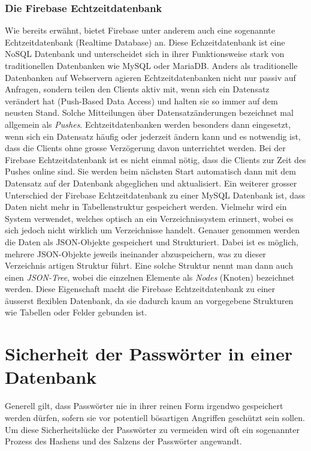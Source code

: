\documentclass[../main.tex]{subfiles}
\begin{document}
	\subsubsection{Die Firebase Echtzeitdatenbank} \label{firebaseRealtime}
	Wie bereits erwähnt, bietet Firebase unter anderem auch eine sogenannte Echtzeitdatenbank (Realtime Database) an. Diese Echzeitdatenbank ist eine NoSQL Datenbank und unterscheidet sich in ihrer Funktionsweise stark von traditionellen Datenbanken wie MySQL oder MariaDB. Anders als traditionelle Datenbanken auf Webservern agieren Echtzeitdatenbanken nicht nur passiv auf Anfragen, sondern teilen den Clients aktiv mit, wenn sich ein Datensatz verändert hat (Push-Based Data Access) und halten sie so immer auf dem neusten Stand. Solche Mitteilungen über Datensatzänderungen bezeichnet mal allgemein als \emph{Pushes}. Echtzeitdatenbanken werden besonders dann eingesetzt, wenn sich ein Datensatz häufig oder jederzeit ändern kann und es notwendig ist, dass die Clients ohne grosse Verzögerung davon unterrichtet werden.\cite{RealtimeDatabase} Bei der Firebase Echtzeitdatenbank ist es nicht einmal nötig, dass die Clients zur Zeit des Pushes online sind. Sie werden beim nächsten Start automatisch dann mit dem Datensatz auf der Datenbank abgeglichen und aktualisiert. Ein weiterer grosser Unterschied der Firebase Echtzeitdatenbank zu einer MySQL Datenbank ist, dass Daten nicht mehr in Tabellenstruktur gespeichert werden. Vielmehr wird ein System verwendet, welches optisch an ein Verzeichnissystem erinnert, wobei es sich jedoch nicht wirklich um Verzeichnisse handelt. Genauer genommen werden die Daten als JSON-Objekte gespeichert und Strukturiert. Dabei ist es möglich, mehrere JSON-Objekte jeweils ineinander abzuspeichern, was zu dieser Verzeichnis artigen Struktur führt. Eine solche Struktur nennt man dann auch einen \emph{JSON-Tree}, wobei die einzelnen Elemente als \emph{Nodes} (Knoten) bezeichnet werden. Diese Eigenschaft macht die Firebase Echtzeitdatenbank zu einer äusserst flexiblen Datenbank, da sie dadurch kaum an vorgegebene Strukturen wie Tabellen oder Felder gebunden ist. \cite{firebaseStructure}\cite{FirebaseRTDB}
	
	
	\section{Sicherheit der Passwörter in einer Datenbank}
	Generell gilt, dass Passwörter nie in ihrer reinen Form irgendwo gespeichert werden dürfen, sofern sie vor potentiell bösartigen Angriffen geschützt sein sollen. Um diese Sicherheitslücke der Passwörter zu vermeiden wird oft ein sogenannter Prozess des Hashens und des Salzens der Passwörter angewandt. 
	
\end{document}

